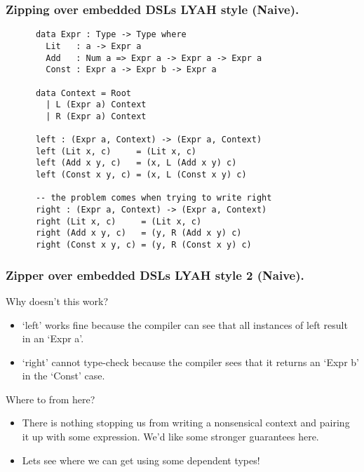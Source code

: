 \documentclass{beamer}
\begin{document}
\begin{frame}[fragile]
  \frametitle{Zipping over embedded DSLs LYAH style (Naive).}
    \begin{verbatim}
      data Expr : Type -> Type where
        Lit   : a -> Expr a
        Add   : Num a => Expr a -> Expr a -> Expr a
        Const : Expr a -> Expr b -> Expr a

      data Context = Root
        | L (Expr a) Context
        | R (Expr a) Context

      left : (Expr a, Context) -> (Expr a, Context)
      left (Lit x, c)     = (Lit x, c)
      left (Add x y, c)   = (x, L (Add x y) c)
      left (Const x y, c) = (x, L (Const x y) c)

      -- the problem comes when trying to write right
      right : (Expr a, Context) -> (Expr a, Context)
      right (Lit x, c)     = (Lit x, c)
      right (Add x y, c)   = (y, R (Add x y) c)
      right (Const x y, c) = (y, R (Const x y) c)
    \end{verbatim}
\end{frame}

\begin{frame}[fragile]
  \frametitle{Zipper over embedded DSLs LYAH style 2 (Naive).}
  \begin{block}{Why doesn't this work?}
    \begin{itemize}
      \item `left' works fine because the compiler can see
        that all instances of left result in an `Expr a'.
      \item `right' cannot type-check because the compiler
        sees that it returns an `Expr b' in the `Const' case.
    \end{itemize}
  \end{block}
  \begin{block}{Where to from here?}
    \begin{itemize}
      \item There is nothing stopping us from writing a nonsensical
        context and pairing it up with some expression. We'd like 
        some stronger guarantees here.
      \item Lets see where we can get using some dependent types!
    \end{itemize}
  \end{block}
\end{frame}
\end{document}
